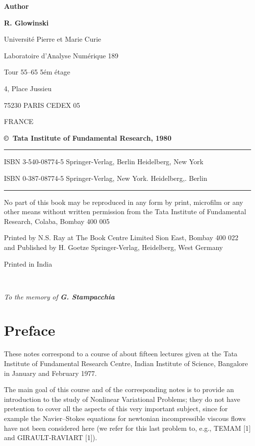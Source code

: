 \thispagestyle{empty}
\begin{center}
{\bf Author}
\medskip

{\large\bf R. Glowinski}

Universit\'e Pierre et Marie Curie 

Laboratoire d'Analyse Num\'erique 189

Tour 55--65 5\'em \'etage 

4, Place Jussieu

75230 PARIS CEDEX 05 

FRANCE
\vfill 

{\bf\copyright\ Tata Institute of Fundamental Research, 1980}
\vfill

\hrule 
\medskip

ISBN 3-540-08774-5 Springer-Verlag, Berlin Heidelberg, New York

ISBN 0-387-08774-5 Springer-Verlag,  New York. Heidelberg,. Berlin 
\medskip

\hrule
\vfill

\parbox{0.7\textwidth}{No part of this book may be reproduced in any form 
by print, microfilm or any other means without written permission from 
the Tata Institute of Fundamental Research, Colaba, Bombay 400 005}
\vfill

Printed by N.S. Ray at The Book Centre Limited Sion East, Bombay 400
022 and Published by H. Goetze Springer-Verlag, Heidelberg, West
Germany

Printed in India
\end{center}
\eject

~
\thispagestyle{empty}
\vfill
\begin{center}

\raggedleft \textsl{To the memory of {\large\bfseries G. Stampacchia}}

\end{center}
\vfill



\chapter{Preface}


These notes correspond to a course of about fifteen lectures given
at the Tata Institute of Fundamental Research Centre, Indian Institute
of Science, Bangalore in January and February 1977.

The main goal of this course and of the corresponding notes is to
provide an introduction to the study of Nonlinear Variational
Problems; they do not have pretention to cover all the aspects of this
very important subject, since for example the Navier--Stokes equations
for newtonian incompressible viscous flows have not been considered
here (we refer for this last problem to, e.g., TEMAM [1] and
GIRAULT-RAVIART [1]).

